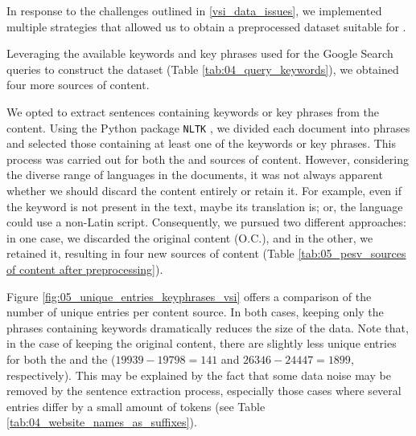 \label{vsi_preprocessing}

In response to the challenges outlined in \headerName{} \ref{vsi_data_issues}, we implemented multiple strategies that allowed us to obtain a preprocessed dataset suitable for \textclassification{}.

\label{vsi_leveraging_keywords}

Leveraging the available keywords and key phrases used for the Google Search queries to construct the dataset (Table \ref{tab:04_query_keywords}), we obtained four more sources of content. 


We opted to extract sentences containing keywords or key phrases from the content. Using the Python package \texttt{NLTK} , we divided each document into phrases and selected those containing at least one of the keywords or key phrases. This process was carried out for both the \trafilaturaAbstract{} and \trafilaturaFulltext{} sources of content. However, considering the diverse range of languages in the documents, it was not always apparent whether we should discard the content entirely or retain it. For example, even if the keyword is not present in the text, maybe its translation is; or, the language could use a non-Latin script. Consequently, we pursued two different approaches: in one case, we discarded the original content (O.C.), and in the other, we retained it, resulting in four new sources of content (Table \ref{tab:05_pesv_sources of content after preprocessing}).




Figure \ref{fig:05_unique_entries_keyphrases_vsi} offers a comparison of the number of unique entries per content source. In both cases, keeping only the phrases containing keywords dramatically reduces the size of the data. Note that, in the case of keeping the original content, there are slightly less unique entries for both the \trafilaturaAbstract{} and the \trafilaturaFulltext{} ($19939-19798 = 141$ and $26346-24447=1899$, respectively). This may be explained by the fact that some data noise may be removed by the sentence extraction process, especially those cases where several entries differ by a small amount of tokens (see Table \ref{tab:04_website_names_as_suffixes}).

